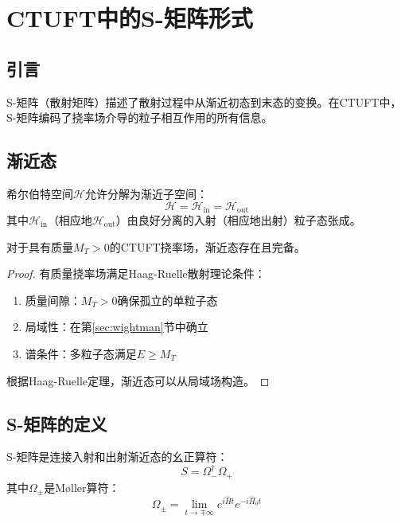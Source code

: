 \section{CTUFT中的S-矩阵形式}
\label{sec:s_matrix}

\subsection{引言}

S-矩阵（散射矩阵）描述了散射过程中从渐近初态到末态的变换。在CTUFT中，S-矩阵编码了挠率场介导的粒子相互作用的所有信息。

\subsection{渐近态}

\begin{definition}[渐近完备性]
希尔伯特空间$\mathcal{H}$允许分解为渐近子空间：
\begin{equation}
    \mathcal{H} = \mathcal{H}_{\text{in}} = \mathcal{H}_{\text{out}}
\end{equation}
其中$\mathcal{H}_{\text{in}}$（相应地$\mathcal{H}_{\text{out}}$）由良好分离的入射（相应地出射）粒子态张成。
\end{definition}

\begin{theorem}[渐近态的存在性]
对于具有质量$M_T > 0$的CTUFT挠率场，渐近态存在且完备。
\end{theorem}

\begin{proof}
有质量挠率场满足Haag-Ruelle散射理论条件：
\begin{enumerate}
    \item 质量间隙：$M_T > 0$确保孤立的单粒子态
    \item 局域性：在第\ref{sec:wightman}节中确立
    \item 谱条件：多粒子态满足$E \geq M_T$
\end{enumerate}
根据Haag-Ruelle定理，渐近态可以从局域场构造。
\end{proof}

\subsection{S-矩阵的定义}

\begin{definition}[S-矩阵]
S-矩阵是连接入射和出射渐近态的幺正算符：
\begin{equation}
    S = \Omega_-^\dagger \Omega_+
\end{equation}
其中$\Omega_\pm$是Møller算符：
\begin{equation}
    \Omega_\pm = \lim_{t \to \mp\infty} e^{i\hat{H}t} e^{-i\hat{H}_0 t}
\end{equation}
\end{definition}

